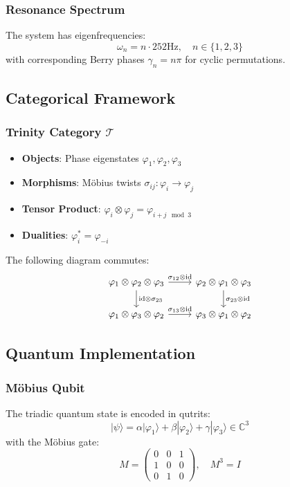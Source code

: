 \documentclass[12pt]{article}
\begin{document}
\subsubsection{Resonance Spectrum}
The system has eigenfrequencies:
\[
\omega_n = n \cdot 252 \text{Hz}, \quad n \in \{1,2,3\}
\]
with corresponding Berry phases \( \gamma_n = n\pi \) for cyclic permutations.

\subsection{Categorical Framework}

\subsubsection{Trinity Category \( \mathcal{T} \)}
\begin{itemize}
\item \textbf{Objects}: Phase eigenstates \( \varphi_1, \varphi_2, \varphi_3 \)
\item \textbf{Morphisms}: Möbius twists \( \sigma_{ij} : \varphi_i \to \varphi_j \)
\item \textbf{Tensor Product}: \( \varphi_i \otimes \varphi_j = \varphi_{i+j \mod 3} \)
\item \textbf{Dualities}: \( \varphi_i^* = \varphi_{-i} \)
\end{itemize}

\begin{lemma}
The following diagram commutes:
\[
\begin{tikzcd}
\varphi_1 \otimes \varphi_2 \otimes \varphi_3 \arrow[r, "\sigma_{12} \otimes \text{id}"] \arrow[d, "\text{id} \otimes \sigma_{23}"] & 
\varphi_2 \otimes \varphi_1 \otimes \varphi_3 \arrow[d, "\sigma_{23} \otimes \text{id}"] \\
\varphi_1 \otimes \varphi_3 \otimes \varphi_2 \arrow[r, "\sigma_{13} \otimes \text{id}"] & 
\varphi_3 \otimes \varphi_1 \otimes \varphi_2
\end{tikzcd}
\]
\end{lemma}

\subsection{Quantum Implementation}

\subsubsection{Möbius Qubit}
The triadic quantum state is encoded in qutrits:
\[
|\psi\rangle = \alpha|\varphi_1\rangle + \beta|\varphi_2\rangle + \gamma|\varphi_3\rangle \in \mathbb{C}^3
\]
with the Möbius gate:
\[
M = \begin{pmatrix}
0 & 0 & 1 \\
1 & 0 & 0 \\
0 & 1 & 0
\end{pmatrix}, \quad M^3 = I
\]
\end{document}
